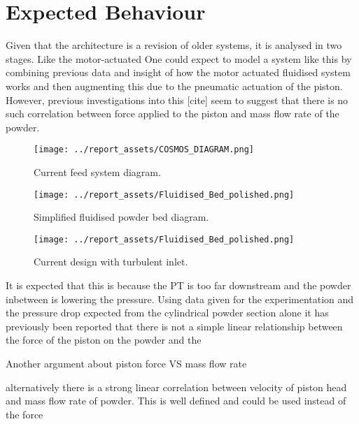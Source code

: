 \section{Expected Behaviour}
Given that the architecture is a revision of older systems, it is analysed in two stages. Like the motor-actuated 
One could expect to model a system like this by combining previous data and insight of how the motor actuated fluidised system works and then augmenting this due to the pneumatic actuation of the piston. However, previous investigations into this [cite] seem to suggest that there is no such correlation between force applied to the piston and mass flow rate of the powder. 

\begin{figure}[htbp]
    \centering

    \begin{minipage}{0.3\textwidth}
        \centering
        \texttt{[image: ../report\_assets/COSMOS\_DIAGRAM.png]}
        \caption{Current feed system diagram.}\label{fig:idkyet1}
    \end{minipage}
    \hfill
    \begin{minipage}{0.3\textwidth}
        \centering
        \texttt{[image: ../report\_assets/Fluidised\_Bed\_polished.png]}
        \caption{Simplified fluidised powder bed diagram.}\label{fig:idkyet2}
    \end{minipage}
    \hfill
    \begin{minipage}{0.3\textwidth}
        \centering
        \texttt{[image: ../report\_assets/Fluidised\_Bed\_polished.png]}
        \caption{Current design with turbulent inlet.}\label{fig:idkyet3}
    \end{minipage}

\end{figure}
It is expected that this is because the PT is too far downstream and the powder inbetween is lowering the pressure. Using data given for the experimentation and the pressure drop expected from the cylindrical powder section alone
it has previously been reported that there is not a simple linear relationship between the force of the piston on the powder and the 


Another argument about piston force VS mass flow rate

alternatively there is a strong linear correlation between velocity of piston head and mass flow rate of powder. This is well defined and could be used instead of the force


